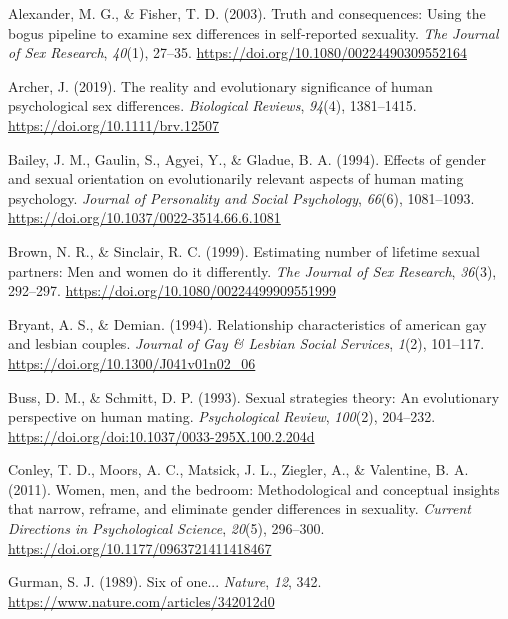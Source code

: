 \documentclass[
  11pt,
]{article}
\newlength{\cslhangindent}
\newlength{\cslentryspacingunit} %
\newenvironment{CSLReferences}[2] %
 {%
  \setlength{\parindent}{0pt}
  \ifodd #1
  \let\oldpar\par
  \def\par{\hangindent=\cslhangindent\oldpar}
  \fi
  \setlength{\parskip}{#2\cslentryspacingunit}
 }%
 {}
\begin{document}
\hypertarget{refs}{}
\begin{CSLReferences}{1}{0}
\leavevmode{}%
Alexander, M. G., \& Fisher, T. D. (2003). Truth and consequences: Using
the bogus pipeline to examine sex differences in self‐reported
sexuality. \emph{The Journal of Sex Research}, \emph{40}(1), 27--35.
\url{https://doi.org/10.1080/00224490309552164}

\leavevmode{}%
Archer, J. (2019). The reality and evolutionary significance of human
psychological sex differences. \emph{Biological Reviews}, \emph{94}(4),
1381--1415. \url{https://doi.org/10.1111/brv.12507}

\leavevmode{}%
Bailey, J. M., Gaulin, S., Agyei, Y., \& Gladue, B. A. (1994). Effects
of gender and sexual orientation on evolutionarily relevant aspects of
human mating psychology. \emph{Journal of Personality and Social
Psychology}, \emph{66}(6), 1081--1093.
\url{https://doi.org/10.1037/0022-3514.66.6.1081}

\leavevmode{}%
Brown, N. R., \& Sinclair, R. C. (1999). Estimating number of lifetime
sexual partners: Men and women do it differently. \emph{The Journal of
Sex Research}, \emph{36}(3), 292--297.
\url{https://doi.org/10.1080/00224499909551999}

\leavevmode{}%
Bryant, A. S., \& Demian. (1994). Relationship characteristics of
american gay and lesbian couples. \emph{Journal of Gay \& Lesbian Social
Services}, \emph{1}(2), 101--117.
\url{https://doi.org/10.1300/J041v01n02_06}

\leavevmode{}%
Buss, D. M., \& Schmitt, D. P. (1993). Sexual strategies theory: An
evolutionary perspective on human mating. \emph{Psychological Review},
\emph{100}(2), 204--232.
\url{https://doi.org/doi:10.1037/0033-295X.100.2.204d}

\leavevmode{}%
Conley, T. D., Moors, A. C., Matsick, J. L., Ziegler, A., \& Valentine,
B. A. (2011). Women, men, and the bedroom: Methodological and conceptual
insights that narrow, reframe, and eliminate gender differences in
sexuality. \emph{Current Directions in Psychological Science},
\emph{20}(5), 296--300. \url{https://doi.org/10.1177/0963721411418467}

\leavevmode{}%
Gurman, S. J. (1989). Six of one... \emph{Nature}, \emph{12}, 342.
\url{https://www.nature.com/articles/342012d0}


\end{CSLReferences}
\end{document}
